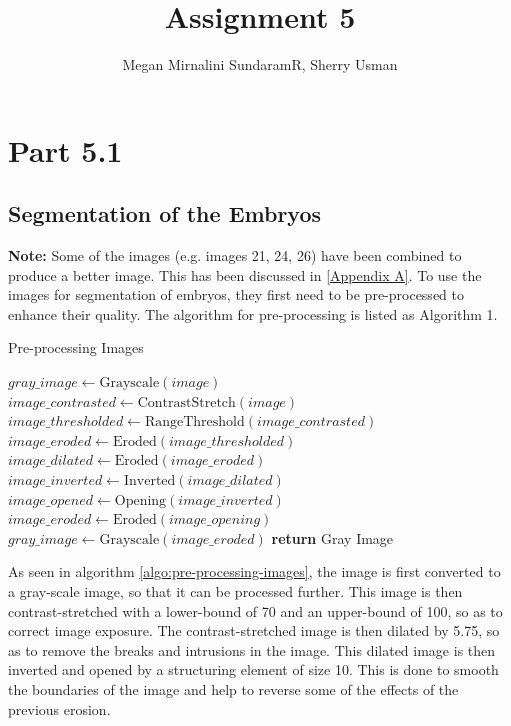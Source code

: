\documentclass{article}
\title{Assignment 5}
\author{Megan Mirnalini SundaramR, Sherry Usman}
\begin{document}
\maketitle


\section*{Part 5.1}
\subsection*{Segmentation of the Embryos}
\textbf{Note:} Some of the images (e.g. images 21, 24, 26) have been combined to produce a better image. \newline This has been discussed in \ref{Appendix A}.
To use the images for segmentation of embryos, they first need to be pre-processed to enhance their quality. The algorithm for pre-processing is listed as Algorithm 1.
\begin{algorithm}[h!]
\caption{Pre-processing Images}\label{algo:pre-processing-images}
\begin{algorithmic}[1]
        \State $gray\_image \gets \text{Grayscale}(image)$
        \State $image\_contrasted \gets \text{ContrastStretch}(image)$
        \State $image\_thresholded \gets \text{RangeThreshold}(image\_contrasted)$
        \State $image\_eroded \gets \text{Eroded}(image\_thresholded)$
        \State $image\_dilated \gets \text{Eroded}(image\_eroded)$
        \State $image\_inverted \gets \text{Inverted}(image\_dilated)$
        \State $image\_opened \gets \text{Opening}(image\_inverted)$
        \State $image\_eroded \gets \text{Eroded}(image\_opening)$
        \State $gray\_image \gets \text{Grayscale}(image\_eroded)$
    \EndFor
    \State \textbf{return} Gray Image
\EndProcedure
\end{algorithmic}
\end{algorithm}

As seen in algorithm \ref{algo:pre-processing-images}, the image is first converted to a gray-scale image, so that it can be processed further. This image is then contrast-stretched with a lower-bound of 70 and an upper-bound of 100, so as to correct image exposure. The contrast-stretched image is then dilated by 5.75, so as to remove the breaks and intrusions in the image. This dilated image is then inverted and opened by a structuring element of size 10. This is done to smooth the boundaries of the image and help to reverse some of the effects of the previous erosion. 
\end{document}
